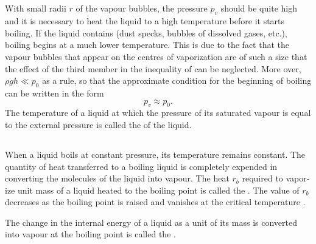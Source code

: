 \subsection{}\label{13.6.3} With small radii $r$ of the vapour bubbles, the pressure $p_{v}$ should be quite high and it is necessary to heat the liquid to a high temperature before it starts boiling. If the liquid contains  (dust specks, bubbles of dissolved gases, etc.), boiling begins at a much lower temperature. This is due to the fact that the vapour bubbles that appear on the centres of vaporization are of such a size that the effect of the third member in the inequality of  can be neglected. More­ over, $\rho gh \ll p_{0}$ as a rule, so that the approximate condition for the beginning of boiling can be written in the form
\begin{equation*}%
p_{v} \approx  p_{0}.
\end{equation*}
The temperature of a liquid at which the pressure of its saturated vapour is equal to the external pressure is called the  of the liquid.

\subsection{}\label{13.6.4} When a liquid boils at constant pressure, its temperature remains constant. The quantity of heat transferred to a boiling liquid is completely expended in converting the molecules of the liquid into vapour. The heat $r_{b}$ required to vapor­ize unit mass of a liquid heated to the boiling point is called the . The value of $r_{b}$ decreases as the boiling point is raised and vanishes at the critical temperature .

The change in the internal energy of a liquid  as a unit of its mass is converted into vapour at the boiling point is called the .

